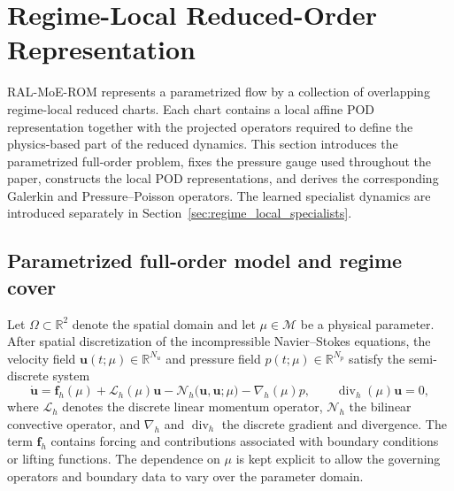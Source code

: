 \section{Regime-Local Reduced-Order Representation}
\label{sec:regime_local_representation}

RAL-MoE-ROM represents a parametrized flow by a collection of overlapping
regime-local reduced charts.  Each chart contains a local affine POD
representation together with the projected operators required to define the
physics-based part of the reduced dynamics.  This section introduces the
parametrized full-order problem, fixes the pressure gauge used throughout the
paper, constructs the local POD representations, and derives the corresponding
Galerkin and Pressure--Poisson operators.  The learned specialist dynamics are
introduced separately in Section~\ref{sec:regime_local_specialists}.

\subsection{Parametrized full-order model and regime cover}
\label{subsec:parametric_regime_decomposition}

Let $\Omega\subset\mathbb{R}^{2}$ denote the spatial domain and let
$\mu\in\mathcal{M}$ be a physical parameter.  After spatial discretization of
the incompressible Navier--Stokes equations, the velocity field
$\boldsymbol{u}(t;\mu)\in\mathbb{R}^{N_u}$ and pressure field
$p(t;\mu)\in\mathbb{R}^{N_p}$ satisfy the semi-discrete system
\begin{equation}
  \dot{\boldsymbol{u}}
  =
  \boldsymbol{f}_{h}(\mu)
  +\mathcal{L}_{h}(\mu)\boldsymbol{u}
  -\mathcal{N}_{h}
   \bigl(\boldsymbol{u},\boldsymbol{u};\mu\bigr)
  -\nabla_{h}(\mu)p,
  \qquad
  \operatorname{div}_{h}(\mu)\boldsymbol{u}=0,
  \label{eq:semidiscrete_incompressible_system}
\end{equation}
where $\mathcal{L}_{h}$ denotes the discrete linear momentum operator,
$\mathcal{N}_{h}$ the bilinear convective operator, and
$\nabla_h$ and $\operatorname{div}_h$ the discrete gradient and divergence.
The term $\boldsymbol{f}_{h}$ contains forcing and contributions associated
with boundary conditions or lifting functions.  The dependence on $\mu$ is
kept explicit to allow the governing operators and boundary data to vary over
the parameter domain.

